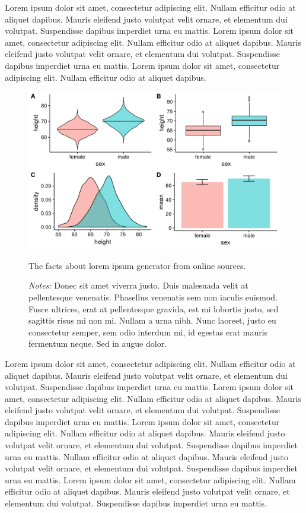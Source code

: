 \documentclass[12pt]{article}
\begin{document}
Lorem ipsum dolor sit amet, consectetur adipiscing elit. Nullam efficitur odio at aliquet dapibus. Mauris eleifend justo volutpat velit ornare, et elementum dui volutpat. Suspendisse dapibus imperdiet urna eu mattis. Lorem ipsum dolor sit amet, consectetur adipiscing elit. Nullam efficitur odio at aliquet dapibus. Mauris eleifend justo volutpat velit ornare, et elementum dui volutpat. Suspendisse dapibus imperdiet urna eu mattis. Lorem ipsum dolor sit amet, consectetur adipiscing elit. Nullam efficitur odio at aliquet dapibus. 


\begin{figure}[H]
    \centering
    \includegraphics[width=1\linewidth]{figures/figure.png}
    \caption{The facts about lorem ipsum generator from online sources.}
    \label{fig:enter-label}
    \caption*{\footnotesize \textit{Notes:} Donec sit amet viverra justo. Duis malesuada velit at pellentesque venenatis. Phasellus venenatis sem non iaculis euismod. Fusce ultrices, erat at pellentesque gravida, est mi lobortis justo, sed sagittis risus mi non mi. Nullam a urna nibh. Nunc laoreet, justo eu consectetur semper, sem odio interdum mi, id egestas erat mauris fermentum neque. Sed in augue dolor.}
\end{figure}

Lorem ipsum dolor sit amet, consectetur adipiscing elit. Nullam efficitur odio at aliquet dapibus. Mauris eleifend justo volutpat velit ornare, et elementum dui volutpat. Suspendisse dapibus imperdiet urna eu mattis. Lorem ipsum dolor sit amet, consectetur adipiscing elit. Nullam efficitur odio at aliquet dapibus. Mauris eleifend justo volutpat velit ornare, et elementum dui volutpat. Suspendisse dapibus imperdiet urna eu mattis. Lorem ipsum dolor sit amet, consectetur adipiscing elit. Nullam efficitur odio at aliquet dapibus. Mauris eleifend justo volutpat velit ornare, et elementum dui volutpat. Suspendisse dapibus imperdiet urna eu mattis. Nullam efficitur odio at aliquet dapibus. Mauris eleifend justo volutpat velit ornare, et elementum dui volutpat. Suspendisse dapibus imperdiet urna eu mattis. Lorem ipsum dolor sit amet, consectetur adipiscing elit. Nullam efficitur odio at aliquet dapibus. Mauris eleifend justo volutpat velit ornare, et elementum dui volutpat. Suspendisse dapibus imperdiet urna eu mattis. 
\end{document}
